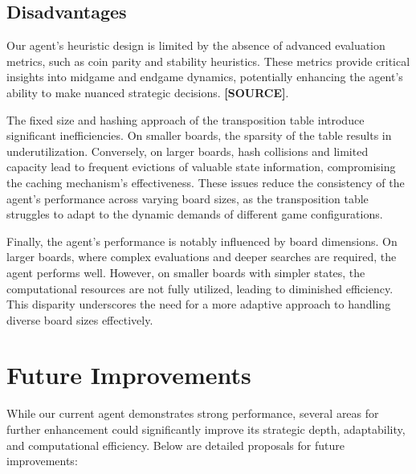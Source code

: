 \documentclass[11pt]{article}
\begin{document}
\subsection*{Disadvantages}
Our agent's heuristic design is limited by the absence of advanced evaluation metrics, such as coin parity and stability heuristics. These metrics provide critical insights into midgame and endgame dynamics, potentially enhancing the agent's ability to make nuanced strategic decisions. \textbf{[SOURCE]}.

The fixed size and hashing approach of the transposition table introduce significant inefficiencies. On smaller boards, the sparsity of the table results in underutilization. Conversely, on larger boards, hash collisions and limited capacity lead to frequent evictions of valuable state information, compromising the caching mechanism's effectiveness. These issues reduce the consistency of the agent's performance across varying board sizes, as the transposition table struggles to adapt to the dynamic demands of different game configurations.

Finally, the agent's performance is notably influenced by board dimensions. On larger boards, where complex evaluations and deeper searches are required, the agent performs well. However, on smaller boards with simpler states, the computational resources are not fully utilized, leading to diminished efficiency. This disparity underscores the need for a more adaptive approach to handling diverse board sizes effectively.



\section*{Future Improvements}
While our current agent demonstrates strong performance, several areas for further enhancement could significantly improve its strategic depth, adaptability, and computational efficiency. Below are detailed proposals for future improvements:
\end{document}
